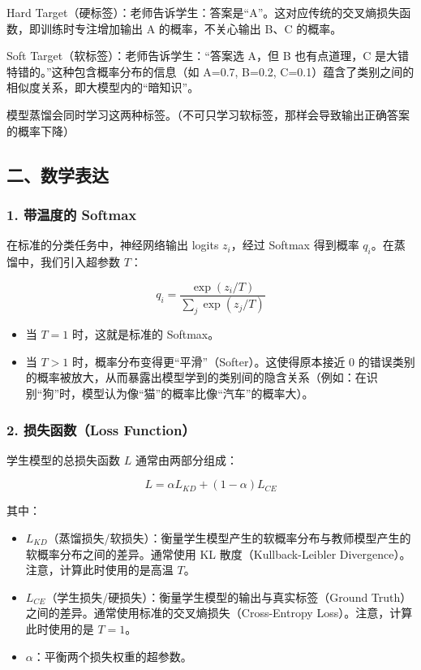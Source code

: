 Hard Target（硬标签）：老师告诉学生：答案是``A''。这对应传统的交叉熵损失函数，即训练时专注增加输出 A 的概率，不关心输出 B、C 的概率。

Soft Target（软标签）：老师告诉学生：``答案选 A，但 B 也有点道理，C 是大错特错的。''这种包含概率分布的信息（如 A=0.7, B=0.2, C=0.1）蕴含了类别之间的相似度关系，即大模型内的``暗知识''。

模型蒸馏会同时学习这两种标签。（不可只学习软标签，那样会导致输出正确答案的概率下降）

\hypertarget{ux4e8cux6570ux5b66ux8868ux8fbe-2}{%
\subsection{二、数学表达}\label{ux4e8cux6570ux5b66ux8868ux8fbe-2}}

\hypertarget{ux5e26ux6e29ux5ea6ux7684-softmax}{%
\subsubsection{1. 带温度的 Softmax}\label{ux5e26ux6e29ux5ea6ux7684-softmax}}

在标准的分类任务中，神经网络输出 logits \(z_i\)，经过 Softmax 得到概率 \(q_i\)。在蒸馏中，我们引入超参数 \(T\)：

\[
q_i = \frac{\exp(z_i / T)}{\sum_j \exp(z_j / T)}
\]

\begin{itemize}
\tightlist
\item
  当 \(T = 1\) 时，这就是标准的 Softmax。
\item
  当 \(T > 1\) 时，概率分布变得更``平滑''（Softer）。这使得原本接近 0 的错误类别的概率被放大，从而暴露出模型学到的类别间的隐含关系（例如：在识别``狗''时，模型认为像``猫''的概率比像``汽车''的概率大）。
\end{itemize}

\hypertarget{ux635fux5931ux51fdux6570loss-function}{%
\subsubsection{2. 损失函数（Loss Function）}\label{ux635fux5931ux51fdux6570loss-function}}

学生模型的总损失函数 \(L\) 通常由两部分组成：

\[
L = \alpha L_{KD} + (1 - \alpha)L_{CE}
\]

其中：

\begin{itemize}
\tightlist
\item
  \(L_{KD}\)（蒸馏损失/软损失）：衡量学生模型产生的软概率分布与教师模型产生的软概率分布之间的差异。通常使用 KL 散度（Kullback-Leibler Divergence）。注意，计算此时使用的是高温 \(T\)。
\item
  \(L_{CE}\)（学生损失/硬损失）：衡量学生模型的输出与真实标签（Ground Truth）之间的差异。通常使用标准的交叉熵损失（Cross-Entropy Loss）。注意，计算此时使用的是 \(T = 1\)。
\item
  \(\alpha\)：平衡两个损失权重的超参数。
\end{itemize}

